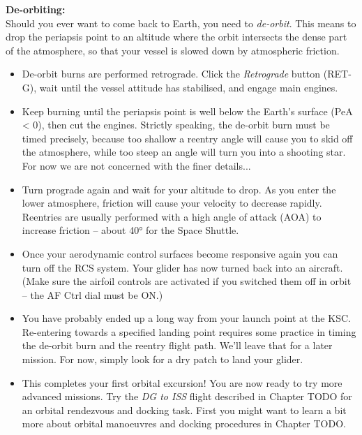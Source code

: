 \documentclass[Orbiter User Manual.tex]{subfiles}
\begin{document}
\noindent
\begin{figure}[H]
	\centering
\end{figure}

\noindent
\textbf{De-orbiting:}\\
Should you ever want to come back to Earth, you need to \textit{de-orbit}. This means to drop the periapsis point to an altitude where the orbit intersects the dense part of the atmosphere, so that your vessel is slowed down by atmospheric friction.

\begin{itemize}
\item De-orbit burns are performed retrograde. Click the \textit{Retrograde} button (RET-G), wait until the vessel attitude has stabilised, and engage main engines.
\item Keep burning until the periapsis point is well below the Earth's surface (PeA < 0), then cut the engines. Strictly speaking, the de-orbit burn must be timed precisely, because too shallow a reentry angle will cause you to skid off the atmosphere, while too steep an angle will turn you into a shooting star. For now we are not concerned with the finer details...
\item Turn prograde again and wait for your altitude to drop. As you enter the lower atmosphere, friction will cause your velocity to decrease rapidly. Reentries are usually performed with a high angle of attack (AOA) to increase friction – about 40° for the Space Shuttle.
\item Once your aerodynamic control surfaces become responsive again you can turn off the RCS system. Your glider has now turned back into an aircraft. (Make sure the airfoil controls are activated if you switched them off in orbit – the AF Ctrl dial must be ON.)
\item You have probably ended up a long way from your launch point at the KSC. Re-entering towards a specified landing point requires some practice in timing the de-orbit burn and the reentry flight path. We'll leave that for a later mission. For now, simply look for a dry patch to land your glider.
\item This completes your first orbital excursion!
You are now ready to try more advanced missions. Try the \textit{DG to ISS} flight described in Chapter TODO for an orbital rendezvous and docking task. First you might want to learn a bit more about orbital manoeuvres and docking procedures in Chapter TODO.
\end{itemize}
\end{document}
